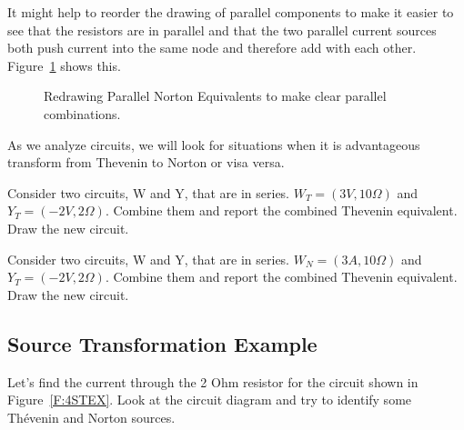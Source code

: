 It might help to reorder the drawing of parallel components to make it easier to see that the resistors are in parallel and that the two parallel current sources both push current into the same node and therefore add with each other. Figure~\ref{F:4STCOM} shows this. \\

\begin{figure}[H]
\begin{center}
\caption{Redrawing Parallel Norton Equivalents to make clear parallel combinations.}
\label{F:4STCOM}
\end{center}
\end{figure}

As we analyze circuits, we will look for situations when it is advantageous transform from Thevenin to Norton or visa versa.

\begin{blevel}
Consider two circuits, W and Y, that are in series. $W_T=(3V,10\Omega)$ and $Y_T=(-2V,2\Omega)$. Combine them and report the combined Thevenin equivalent. Draw the new circuit.
\end{blevel}

\begin{clevel}
Consider two circuits, W and Y, that are in series. $W_N=(3A,10\Omega)$ and $Y_T=(-2V,2\Omega)$. Combine them and report the combined Thevenin equivalent. Draw the new circuit.
\end{clevel}

\subsection{Source Transformation Example}
Let's find the current through the 2 Ohm resistor for the circuit shown in Figure~\ref{F:4STEX}. Look at the circuit diagram and try to identify some Th\'{e}venin and Norton sources.

